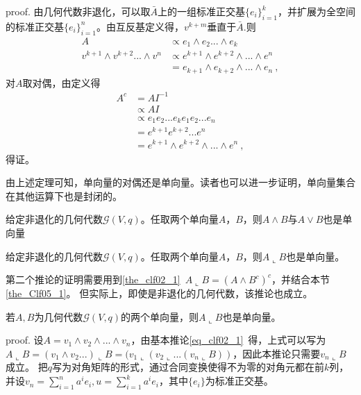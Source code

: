 proof.
由几何代数非退化，可以取$\bar A$上的一组标准正交基$\{e_i\}^k_{i=1}$，并扩展为全空间的标准正交基$\{e_i\}^n_{i=1}$。由互反基定义得，$v^{k+m}$垂直于$\bar A$.则
\begin{equation}
\begin{aligned}
A&\propto e_1\wedge e_2...\wedge e_k\\
v^{k+1}\wedge v^{k+2}...\wedge v^n&\propto e^{k+1}\wedge e^{k+2}\wedge...\wedge e^n\\
&=e_{k+1}\wedge e_{k+2}\wedge...\wedge e_n~,
\end{aligned}
\end{equation}
对$A$取对偶，由定义得
\begin{equation}
\begin{aligned}
A^c&=AI^{-1}\\
&\propto AI\\
&\propto e_1 e_2... e_k e_1 e_2... e_n\\
&=e^{k+1} e^{k+2}... e^n\\
&=e^{k+1}\wedge e^{k+2}\wedge...\wedge e^n~,
\end{aligned}
\end{equation}
得证。

由上述定理可知，单向量的对偶还是单向量。读者也可以进一步证明，单向量集合在其他运算下也是封闭的。
\begin{corollary}{}
给定非退化的几何代数$\mathcal G(V,q)$。任取两个单向量$A$，$B$，则$A\wedge B$与$A\vee B$也是单向量
\end{corollary}
\begin{corollary}{}\label{cor_Clf05_1}
给定非退化的几何代数$\mathcal G(V,q)$。任取两个单向量$A$，$B$，则$A\llcorner B$也是单向量。
\end{corollary}
第二个推论的证明需要用到\autoref{the_clf02_1}~$A\llcorner B=(A\wedge B^c)^c$，并结合本节\autoref{the_Clf05_1}。
但实际上，即使是非退化的几何代数，该推论也成立。
\begin{corollary}{}\label{cor_Clf05_2}
若$A,B$为几何代数$\mathcal G(V,q)$的两个单向量，则$A\llcorner B$也是单向量。
\end{corollary}
proof.
设$A=v_1\wedge v_2\wedge...\wedge v_n$，由基本推论\autoref{eq_clf02_1}~得，上式可以写为$A\llcorner B=(v_1\wedge v_2...)\llcorner B=(v_1\llcorner (v_2\llcorner...(v_n\llcorner B))$，因此本推论只需要$v_n\llcorner B$成立。
把$q$写为对角矩阵的形式，通过合同变换使得不为零的对角元都在前$k$列，并设$v_n=\sum \limits^{n}_{i=1}a^i e_i,u=\sum \limits^{k}_{i=1}a^i e_i$，其中$\{e_i\}$为标准正交基。


